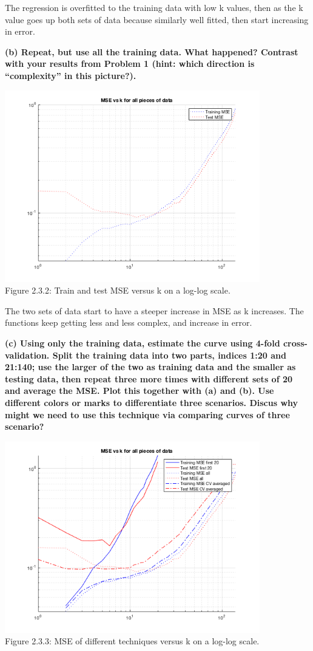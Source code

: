\documentclass[]{scrreprt}   %
\begin{document}
{The regression is overfitted to the training data with low k values, then as the k value goes up both sets of data because similarly well fitted, then start increasing in error.}

\textbf{(b) Repeat, but use all the training data. What happened? Contrast with your results from Problem 1 (hint: which direction is “complexity” in this picture?).}

\begin{center}
	\includegraphics[width=30em,keepaspectratio]{p3figure2.png}\\
	{Figure 2.3.2: Train and test MSE versus k on a log-log scale.}
\end{center} 

{The two sets of data start to have a steeper increase in MSE as k increases. The functions keep getting less and less complex, and increase in error.}

\textbf{(c) Using only the training data, estimate the curve using 4-fold cross-validation. Split the training data into two parts, indices 1:20 and 21:140; use the larger of the two as training data and the smaller as testing data, then repeat three more times with different sets of 20 and average the MSE. Plot this together with (a) and (b). Use different colors or marks to differentiate three scenarios. Discus why might we need to use this technique via comparing curves of three scenario?}

\begin{center}
	\includegraphics[width=30em,keepaspectratio]{p3figure3.png}\\
	{Figure 2.3.3: MSE of different techniques versus k on a log-log scale.}
\end{center} 
\end{document}
